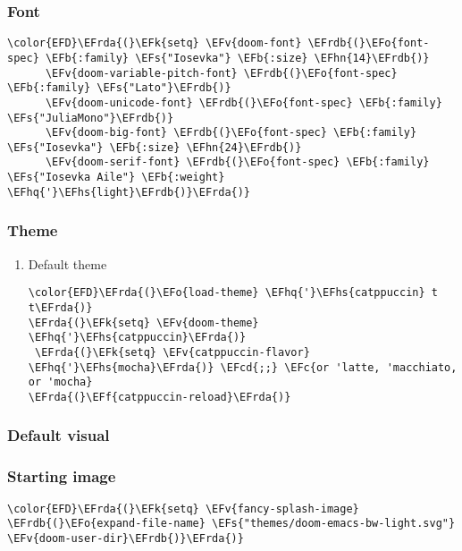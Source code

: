 \documentclass[12pt]{article}
\theoremstyle{plain}%
\theoremstyle{definition}
\theoremstyle{remark}
\newcommand{\EFc}[1]{\textcolor{EFc}{#1}} %
\newcommand{\EFcd}[1]{\textcolor{EFcd}{#1}} %
\newcommand{\EFs}[1]{\textcolor{EFs}{#1}} %
\newcommand{\EFk}[1]{\textcolor{EFk}{#1}} %
\newcommand{\EFb}[1]{\textcolor{EFb}{#1}} %
\newcommand{\EFf}[1]{\textcolor{EFf}{#1}} %
\newcommand{\EFv}[1]{\textcolor{EFv}{#1}} %
\newcommand{\EFo}[1]{\textcolor{EFo}{#1}} %
\newcommand{\EFhn}[1]{\textcolor{EFhn}{\textbf{#1}}} %
\newcommand{\EFhq}[1]{\textcolor{EFhq}{#1}} %
\newcommand{\EFhs}[1]{\textcolor{EFhs}{#1}} %
\newcommand{\EFrda}[1]{\textcolor{EFrda}{#1}} %
\newcommand{\EFrdb}[1]{\textcolor{EFrdb}{#1}} %
\begin{document}
\subsubsection{Font}
\label{sec:orgcb2285b}
\begin{Code}
\begin{Verbatim}
\color{EFD}\EFrda{(}\EFk{setq} \EFv{doom-font} \EFrdb{(}\EFo{font-spec} \EFb{:family} \EFs{"Iosevka"} \EFb{:size} \EFhn{14}\EFrdb{)}
      \EFv{doom-variable-pitch-font} \EFrdb{(}\EFo{font-spec} \EFb{:family} \EFs{"Lato"}\EFrdb{)}
      \EFv{doom-unicode-font} \EFrdb{(}\EFo{font-spec} \EFb{:family} \EFs{"JuliaMono"}\EFrdb{)}
      \EFv{doom-big-font} \EFrdb{(}\EFo{font-spec} \EFb{:family} \EFs{"Iosevka"} \EFb{:size} \EFhn{24}\EFrdb{)}
      \EFv{doom-serif-font} \EFrdb{(}\EFo{font-spec} \EFb{:family} \EFs{"Iosevka Aile"} \EFb{:weight} \EFhq{'}\EFhs{light}\EFrdb{)}\EFrda{)}
\end{Verbatim}
\end{Code}
\subsubsection{Theme}
\label{sec:orgc5e72ff}
\begin{enumerate}
\item Default theme
\label{sec:org26a18e1}
\begin{Code}
\begin{Verbatim}
\color{EFD}\EFrda{(}\EFo{load-theme} \EFhq{'}\EFhs{catppuccin} t t\EFrda{)}
\EFrda{(}\EFk{setq} \EFv{doom-theme} \EFhq{'}\EFhs{catppuccin}\EFrda{)}
 \EFrda{(}\EFk{setq} \EFv{catppuccin-flavor} \EFhq{'}\EFhs{mocha}\EFrda{)} \EFcd{;;} \EFc{or 'latte, 'macchiato, or 'mocha}
\EFrda{(}\EFf{catppuccin-reload}\EFrda{)}
\end{Verbatim}
\end{Code}
\end{enumerate}
\subsubsection{Default visual}
\label{sec:org70e5f39}
\subsubsection{Starting image}
\label{sec:orgfe53d13}
\begin{Code}
\begin{Verbatim}
\color{EFD}\EFrda{(}\EFk{setq} \EFv{fancy-splash-image} \EFrdb{(}\EFo{expand-file-name} \EFs{"themes/doom-emacs-bw-light.svg"} \EFv{doom-user-dir}\EFrdb{)}\EFrda{)}
\end{Verbatim}
\end{Code}
\end{document}
